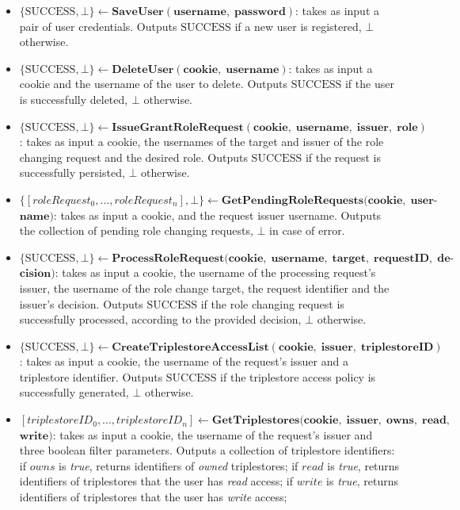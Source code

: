 \begin{definition}
\begin{itemize}
        \item $\{\textrm{SUCCESS}, \bot\} \leftarrow \mathbf{SaveUser(username, \; password)}$: takes as input a pair of user credentials. Outputs $\textrm{SUCCESS}$ if a new user is registered, $\bot$ otherwise.

        \item $\{\textrm{SUCCESS}, \bot\} \leftarrow \mathbf{DeleteUser(cookie, \; username)}$: takes as input a cookie and the username of the user to delete. Outputs $\textrm{SUCCESS}$ if the user is successfully deleted, $\bot$ otherwise.

        \item $\{\textrm{SUCCESS}, \bot\} \leftarrow  \mathbf{IssueGrantRoleRequest(cookie, \; username, \;issuer, \; role)}$: takes as input a cookie, the usernames of the target and issuer of the role changing request and the desired role. Outputs $\textrm{SUCCESS}$ if the request is successfully persisted, $\bot$ otherwise.

        \item $\{[roleRequest_0,...,roleRequest_n], \bot \} \leftarrow  \mathbf{GetPendingRoleRequests(cookie, \; user\textrm{-}}$ \linebreak $\mathbf{name)}$: takes as input a cookie, and the request issuer username. Outputs the collection of pending role changing requests, $\bot$ in case of error.

        \item $\{\textrm{SUCCESS}, \bot\} \leftarrow \mathbf{ProcessRoleRequest(cookie, \; username, \; target, \; requestID, \;de\textrm{-}}$ \linebreak $\mathbf{cision)}$: takes as input a cookie, the username of the processing request's issuer, the username of the role change target, the request identifier and the issuer's decision. Outputs $\textrm{SUCCESS}$ if the role changing request is successfully processed, according to the provided decision, $\bot$ otherwise.

        \item $\{\textrm{SUCCESS}, \bot\} \leftarrow \mathbf{CreateTriplestoreAccessList(cookie, \; issuer, \; triplestoreID)}$: \linebreak takes as input a cookie, the username of the request's issuer and a triplestore identifier. Outputs $\textrm{SUCCESS}$ if the triplestore access policy is successfully generated, $\bot$ otherwise.

        \item $[triplestoreID_0, ..., triplestoreID_n]  \leftarrow \mathbf{GetTriplestores(cookie, \; issuer, \; owns, \; read,}$\linebreak$\mathbf{write)}$: takes as input a cookie, the username of the request's issuer and three boolean filter parameters. Outputs a collection of triplestore identifiers: if $owns$ is \emph{true}, returns identifiers of \emph{owned} triplestores; if $read$ is \emph{true}, returns identifiers of triplestores that the user has \emph{read} access; if $write$ is \emph{true}, returns identifiers of triplestores that the user has \emph{write} access;


\end{itemize}
\end{definition}
